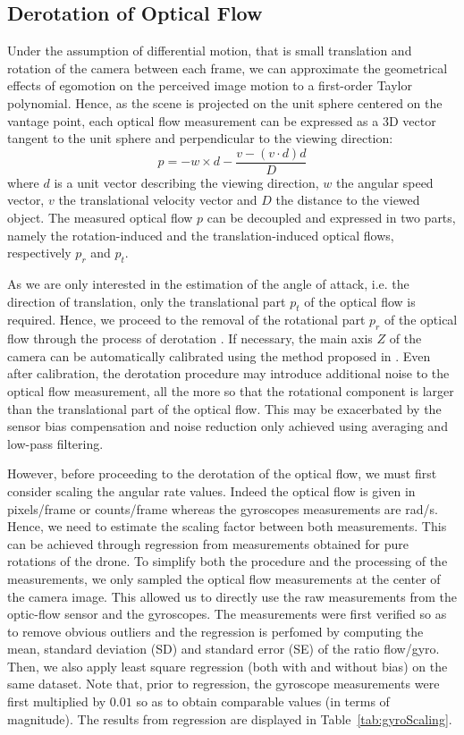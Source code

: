\subsection{Derotation of Optical Flow}
Under the assumption of differential motion, that is small translation and rotation of the camera between each frame, we can approximate the geometrical effects of egomotion on the perceived image motion to a first-order Taylor polynomial. Hence, as the scene is projected on the unit sphere centered on the vantage point, each optical flow measurement can be expressed as a 3D vector tangent to the unit sphere and perpendicular to the viewing direction:
\begin{equation}
\label{opticflow}
p = -w \times d - \dfrac{v - (v \cdot d)d}{D}
\end{equation}
where $d$ is a unit vector describing the viewing direction, $w$ the angular speed vector, $v$ the translational velocity vector and $D$ the distance to the viewed object. The measured optical flow $p$ can be decoupled and expressed in two parts, namely the rotation-induced and the translation-induced optical flows, respectively $p_r$ and $p_t$.

As we are only interested in the estimation of the angle of attack, i.e. the direction of translation, only the translational part $p_t$ of the optical flow is required. Hence, we proceed to the removal of the rotational part $p_r$ of the optical flow through the process of derotation \cite{derotation}. If necessary, the main axis $Z$ of the camera can be automatically calibrated using the method proposed in \cite{autocalib}. Even after calibration, the derotation procedure may introduce additional noise to the optical flow measurement, all the more so that the rotational component is larger than the translational part of the optical flow. This may be exacerbated by the sensor bias compensation and noise reduction only achieved using averaging and low-pass filtering.

However, before proceeding to the derotation of the optical flow, we must first consider scaling the angular rate values. Indeed the optical flow is given in pixels/frame or counts/frame whereas the gyroscopes measurements are rad/s. Hence, we need to estimate the scaling factor between both measurements. This can be achieved through regression from measurements obtained for pure rotations of the drone. To simplify both the procedure and the processing of the measurements, we only sampled the optical flow measurements at the center of the camera image. This allowed us to directly use the raw measurements from the optic-flow sensor and the gyroscopes. The measurements were first verified so as to remove obvious outliers and the regression is perfomed by computing the mean, standard deviation (SD) and standard error (SE) of the ratio flow/gyro. Then, we also apply least square regression (both with and without bias) on the same dataset. Note that, prior to regression, the gyroscope measurements were first multiplied by $0.01$ so as to obtain comparable values (in terms of magnitude). The results from regression are displayed in Table~\ref{tab:gyroScaling}.

